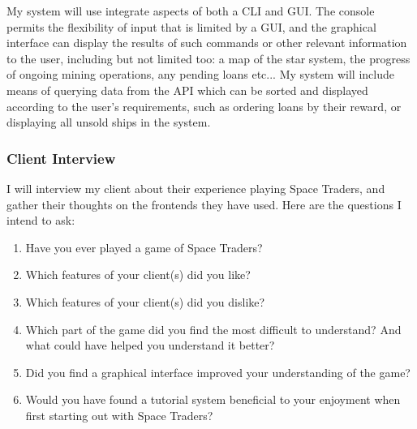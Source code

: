 My system will use integrate aspects of both a CLI and GUI. The console permits the flexibility of input that is limited by a GUI, and the graphical interface can display the results of such commands or other relevant information to the user, including but not limited too: a map of the star system, the progress of ongoing mining operations, any pending loans etc... My system will include means of querying data from the API which can be sorted and displayed according to the user's requirements, such as ordering loans by their reward, or displaying all unsold ships in the system. 

\subsubsection{Client Interview}
I will interview my client about their experience playing Space Traders, and gather their thoughts on the frontends they have used. Here are the questions I intend to ask:
\begin{enumerate}
    \item Have you ever played a game of Space Traders?
    \item Which features of your client(s) did you like?
    \item Which features of your client(s) did you dislike?
    \item Which part of the game did you find the most difficult to understand? And what could have helped you understand it better?
    \item Did you find a graphical interface improved your understanding of the game?
    \item Would you have found a tutorial system beneficial to your enjoyment when first starting out with Space Traders? 
\end{enumerate}
